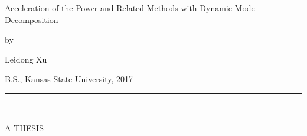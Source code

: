 \begin{center}

   \vspace{1cm}


\large Acceleration of the Power and Related Methods with Dynamic Mode Decomposition\\

\vspace{0.5cm}

by\\

\vspace{0.5cm}


\large Leidong Xu\\

 \vspace{0.3cm}


   B.S., Kansas State University, 2017\\

   \vspace{0.35cm}
   \rule{2in}{0.5pt}\\
   \vspace{0.65cm}

   {\large A THESIS}\\


\end{center}
